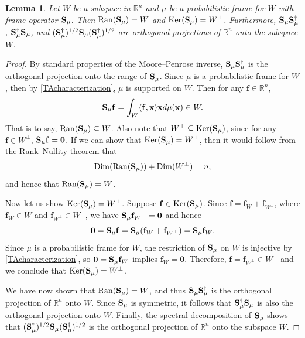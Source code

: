 \documentclass{amsart}
\numberwithin{equation}{section}
\DeclareMathOperator{\Dim}{Dim}
\theoremstyle{plain}
\newtheorem{lemma}[theorem]{Lemma}
\theoremstyle{remark}
\theoremstyle{definition}
\begin{document}
\begin{lemma}\label{lemma:frame_projection}
    Let $W$ be a subspace in $\mathbb{R}^n$ and $\mu$ be a probabilistic frame for $W$ with frame operator ${\bf S}_\mu$. Then $\mathrm{Ran}({\bf S}_\mu)=W$ and $\mathrm{Ker}({\bf S}_\mu) = W^\perp$. Furthermore, ${\bf S}_\mu {\bf S}_\mu^{\dagger}$, ${\bf S}_\mu^{\dagger} {\bf S}_\mu$, and $({\bf S}_{\mu}^\dagger)^{1/2} {\bf S}_{\mu}  ({\bf S}_{\mu}^\dagger)^{1/2}$ are orthogonal projections of $\mathbb{R}^n$ onto the subspace $W$. 
\end{lemma}
\begin{proof}
By standard properties of the Moore–Penrose inverse, ${\bf S}_\mu {\bf S}_\mu^{\dagger}$ is the orthogonal projection onto the range of ${\bf S}_\mu$. Since $\mu$ is a probabilistic frame for $W$, then by \cref{TAcharacterization},  $\mu$ is supported on $W$. Then for any $ \mathbf{f} \in \mathbb{R}^n$,
  $$
  {\bf S}_\mu \mathbf{f}=\int_W \langle \mathbf{f},\mathbf{x}\rangle \mathbf{x} d\mu(\mathbf{x}) \in W.
  $$
That is to say, $\mathrm{Ran}({\bf S}_\mu)\subseteq W$. Also note that $W^\perp \subseteq \mathrm{Ker}({\bf S}_\mu)$, since for any $\mathbf{f} \in W^\perp$, ${\bf S}_\mu \mathbf{f} = \mathbf{0}$. If we can show that $\mathrm{Ker}({\bf S}_\mu) = W^\perp$, then it would follow from the Rank–Nullity theorem that
\begin{equation*}
    \Dim(\mathrm{Ran}({\bf S}_\mu)) + \Dim(W^\perp) = n,
\end{equation*}
and hence that
$\mathrm{Ran}({\bf S}_\mu)=W$. 

Now let us show $\mathrm{Ker}({\bf S}_\mu) = W^\perp$. Suppose $\mathbf{f} \in \operatorname{Ker}({\bf S}_\mu)$. Since $\mathbf{f} = \mathbf{f}_W + \mathbf{f}_{W^\perp}$, where $\mathbf{f}_W  \in W$ and $\mathbf{f}_{W^\perp} \in W^\perp$, we have ${\bf S}_\mu \mathbf{f}_{W^\perp} = \mathbf{0}$ and hence 
\begin{equation*}
  \mathbf{0} = {\bf S}_\mu \mathbf{f} =  {\bf S}_\mu (\mathbf{f}_W + \mathbf{f}_{W^\perp}) = {\bf S}_\mu \mathbf{f}_W.
\end{equation*}
Since $\mu$ is a probabilistic frame for $W$, the restriction of ${\bf S}_\mu$  on $W$ is injective by \cref{TAcharacterization}, so $\mathbf{0} = {\bf S}_\mu \mathbf{f}_W$ implies $\mathbf{f}_W = \mathbf{0}$. Therefore, $\mathbf{f} =  \mathbf{f}_{W^\perp} \in W^\perp$ and we conclude that $\mathrm{Ker}({\bf S}_\mu) = W^\perp$.
 

We have now shown that $\mathrm{Ran}({\bf S}_\mu)=W$, 
and thus ${\bf S}_\mu {\bf S}_\mu^{\dagger}$ is the orthogonal projection of $\mathbb{R}^n$ onto $W$. Since ${\bf S}_\mu$ is symmetric, it follows that ${\bf S}_\mu^{\dagger} {\bf S}_\mu$ is also the orthogonal projection onto $W$. Finally, the spectral decomposition of ${\bf S}_\mu$ shows that $({\bf S}_{\mu}^\dagger)^{1/2} {\bf S}_{\mu}  ({\bf S}_{\mu}^\dagger)^{1/2}$ is the orthogonal projection of $\mathbb{R}^n$ onto the subspace $W$. 
\end{proof}
\end{document}
